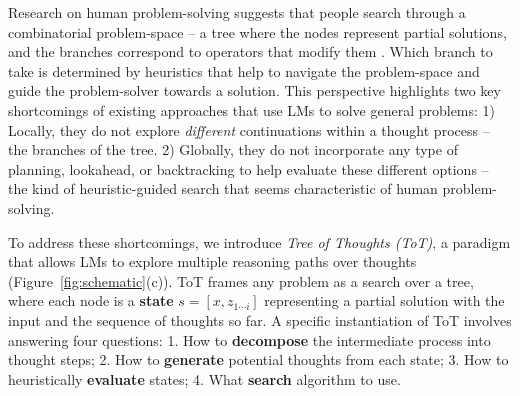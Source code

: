 \documentclass{article}
\begin{document}
Research on human problem-solving suggests that people search through a combinatorial problem-space -- a tree where the nodes represent partial solutions, and the branches correspond to operators that modify them \cite{newell1959report,newell1972human}. Which branch to take is determined by heuristics that help to navigate the problem-space and guide the problem-solver towards a solution. This perspective highlights two key shortcomings of existing approaches that use LMs to solve general problems: 1) Locally, they do not explore {\em different} continuations within a thought process -- the branches of the tree. 2) Globally, they do not incorporate any type of planning, lookahead, or backtracking to help evaluate these different options %
-- the kind of heuristic-guided search that seems characteristic of human problem-solving. 

To address these shortcomings, we introduce \emph{Tree of Thoughts (ToT)}, a paradigm that allows LMs to explore multiple reasoning paths over thoughts (Figure~\ref{fig:schematic}(c)). ToT frames any problem as a search over a tree, where each node is a \textbf{state} $s = [x, z_{1 \cdots i}]$ representing a partial solution with the input and the sequence of thoughts so far.  A specific instantiation of ToT involves answering four questions: 1. How to \textbf{decompose}  the intermediate process into thought steps; 2. How to \textbf{generate} potential thoughts from each state; 3. How to heuristically \textbf{evaluate} states; 4. What \textbf{search} algorithm to use. 


\end{document}

